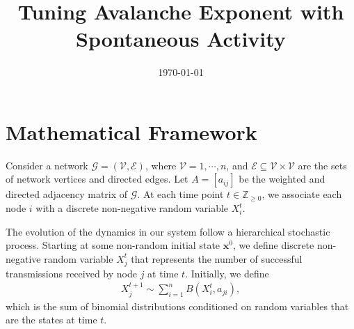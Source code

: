\documentclass[superscriptaddress]{revtex4-1}
\newcommand{\mc}{\mathcal}
\begin{document}
\title{Tuning Avalanche Exponent with Spontaneous Activity}
\date{\today}

\maketitle


\section{Mathematical Framework}
Consider a network $\mc G = (\mc V, \mc E)$, where $\mc V = {1, \dotsm, n}$, and $\mc E \subseteq \mc V \times \mc V$ are the sets of network vertices and directed edges. Let $A = [a_{ij}]$ be the weighted and directed adjacency matrix of $\mc G$. At each time point $t \in \mathbb{Z}_{\geq 0}$, we associate each node $i$ with a discrete non-negative random variable $X_i^t$.

The evolution of the dynamics in our system follow a hierarchical stochastic process. Starting at some non-random initial state $\bm{x}^0$, we define discrete non-negative random variable $X_{j}^t$ that represents the number of successful transmissions received by node $j$ at time $t$. Initially, we define
\begin{align*}
X_j^{t+1} \sim \sum_{i=1}^n B(X_i^{t},a_{ji}),
\end{align*}
which is the sum of binomial distributions conditioned on random variables that are the states at time $t$.
\end{document}
